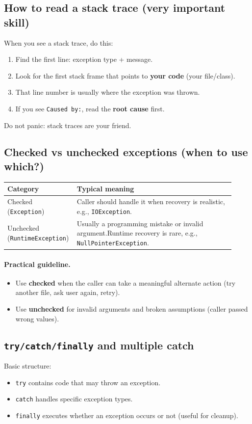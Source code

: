 \documentclass[11pt]{article}
\begin{document}
\subsection{How to read a stack trace (very important skill)}
When you see a stack trace, do this:
\begin{enumerate}
  \item Find the first line: exception type + message.
  \item Look for the first stack frame that points to \textbf{your code} (your file/class).
  \item That line number is usually where the exception was thrown.
  \item If you see \texttt{Caused by:}, read the \textbf{root cause} first.
\end{enumerate}
Do not panic: stack traces are your friend.

\subsection{Checked vs unchecked exceptions (when to use which?)}
\small
\begin{tabular}{@{}p{0.24\linewidth}p{0.68\linewidth}@{}}
\toprule
\textbf{Category} & \textbf{Typical meaning} \\
\midrule
Checked (\texttt{Exception}) & {\raggedright Caller should handle it when recovery is realistic, e.g., \texttt{IOException}.} \\
Unchecked (\texttt{RuntimeException}) & {\raggedright Usually a programming mistake or invalid argument.\newline Runtime recovery is rare, e.g., \texttt{NullPointerException}.} \\
\bottomrule
\end{tabular}
\normalsize

\paragraph{Practical guideline.}
\begin{itemize}
  \item Use \textbf{checked} when the caller can take a meaningful alternate action (try another file, ask user again, retry).
  \item Use \textbf{unchecked} for invalid arguments and broken assumptions (caller passed wrong values).
\end{itemize}

\subsection{\texttt{try/catch/finally} and multiple catch}
Basic structure:
\begin{itemize}
  \item \texttt{try} contains code that may throw an exception.
  \item \texttt{catch} handles specific exception types.
  \item \texttt{finally} executes whether an exception occurs or not (useful for cleanup).
\end{itemize}
\end{document}
